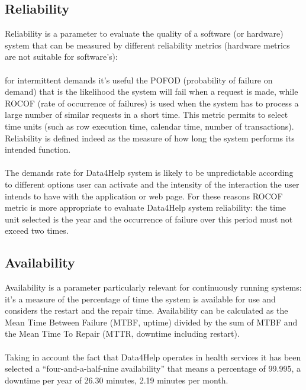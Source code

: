 \subsection{Reliability}
Reliability is a parameter to evaluate the quality of a software (or hardware) system that can be measured by different reliability metrics (hardware metrics are not suitable for software’s):
\\ 
\\
for intermittent demands it’s useful the POFOD (probability of failure on demand) that is the likelihood the system will fail when a request is made, while ROCOF (rate of occurrence of failures) is used when the system has to process a large number of similar requests in a short time. This metric permits to select time units (such as row execution time, calendar time, number of transactions). Reliability is defined indeed as the measure of how long the system performs its intended function. 
\\
\\
The demands rate for Data4Help system is likely to be unpredictable according to different options user can activate and the intensity of the interaction the user intends to have with the application or web page. For these reasons ROCOF metric is more appropriate to evaluate Data4Help system reliability: the time unit selected is the year and the occurrence of failure over this period must not exceed two times. 

\subsection{Availability}
Availability is a parameter particularly relevant for continuously running systems: it’s a measure of the percentage of time the system is available for use and considers the restart and the repair time. Availability can be calculated as the Mean Time Between Failure (MTBF, uptime) divided by the sum of MTBF and the Mean Time To Repair (MTTR, downtime including restart).
\\
\\ 
Taking in account the fact that Data4Help operates in health services it has been selected a “four-and-a-half-nine availability” that means a percentage of 99.995, a downtime per year of 26.30 minutes, 2.19 minutes per month.  
